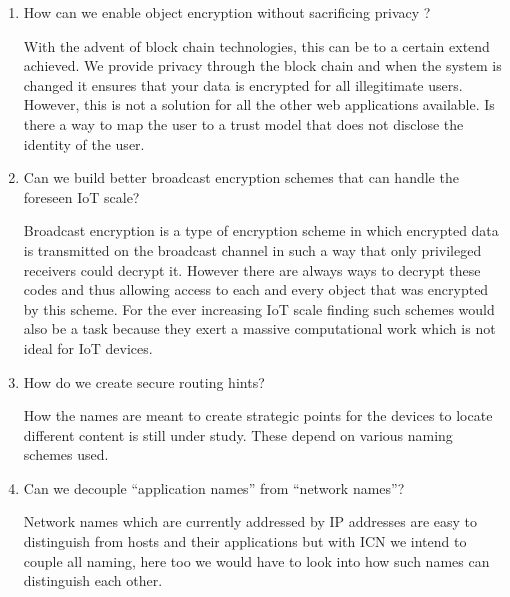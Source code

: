 \begin{enumerate}
\item How can we enable object encryption without sacrificing privacy ? \par
With the advent of block chain technologies, this can be to a certain extend achieved. We provide privacy through the block chain and when the system is changed it ensures that your data is encrypted for all illegitimate users. However, this is not a solution for all the other web applications available. Is there a way to map the user to a trust model that does not disclose the identity of the user. 
\item Can we build better broadcast encryption schemes that can handle the foreseen IoT scale?\par
Broadcast encryption is a type of encryption scheme in which encrypted data is transmitted on the broadcast channel in such a way that only privileged receivers could decrypt it. However there are always ways to decrypt these codes and thus allowing access to each and every object that was encrypted by this scheme. For the ever increasing IoT scale finding such schemes would also be a task because they exert a massive computational work which is not ideal for IoT devices.  
\item How do we create secure routing hints? \par
How the names are meant to create strategic points for the devices to locate different content is still under study. These depend on various naming schemes used.
\item Can we decouple “application names” from “network names”? \par
Network names which are currently addressed by IP addresses are easy to distinguish from hosts and their applications but with ICN we intend to couple all naming, here too we would have to look into how such names can distinguish each other.
\end{enumerate}